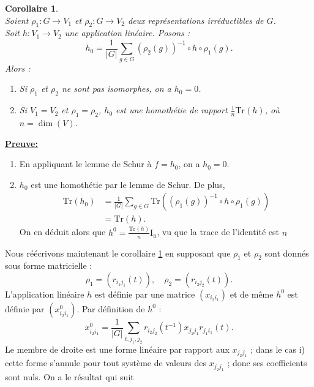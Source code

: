 \documentclass[a4paper, 14pt]{report}
\newtheorem{corollary}{Corollaire}[section]
\begin{document}
\begin{onehalfspace}
{\begin{enumerate} [label=\roman*)]
\end{enumerate}
	

\begin{corollary} \cite{serre1971representation} \label{cor1}\\
Soient \( \rho_1 : G \rightarrow V_1 \) et \( \rho_2 : G \rightarrow V_2 \) deux représentations irréductibles de \( G \). \\
Soit \( h  : V_1 \to V_2 \) une application linéaire. Posons :
	\[
	h_0 = \frac{1}{|G|} \sum_{g \in G} (\rho_2(g))^{-1} \circ h \circ \rho_1(g).
	\]
Alors :
	\begin{enumerate}[label=\roman*)]
		\item Si \( \rho_1 \) et \( \rho_2 \) ne sont pas isomorphes, on a \( h_0 = 0 \).
		\item Si \( V_1 = V_2 \) et \( \rho_1 = \rho_2 \), \( h_0 \) est une homothétie de rapport \( \frac{1}{n} \text{Tr}(h)  \), où \( n = \dim(V) \).
	\end{enumerate}
\end{corollary}

	
\textbf{\underline{Preuve:}}
\begin{enumerate}[label=\roman*)]
	\item En appliquant le lemme de Schur à \( f = h_0 \), on a \( h_0 = 0 \).
	\item \( h_0 \) est une homothétie par le lemme de Schur. De plus, \[
	\begin{aligned}
		\text{Tr}(h_0) &= \frac{1}{|G|} \sum_{g \in G} \text{Tr}((\rho_1(g))^{-1} \circ h \circ \rho_1(g)) \\
		&= \text{Tr}(h).
	\end{aligned}
	\]
On en déduit alors que \( h^0 = \frac{\text{Tr}(h)}{n} \mathrm{I_n} \), vu que la trace de l’identité est \( n \)
\end{enumerate}

Nous réécrivons maintenant le corollaire \ref{cor1} en supposant que $\rho_1$ et $\rho_2$ sont donnés sous forme matricielle :
\[
\rho_{1} = (r_{i_1 j_1}(t)), \quad \rho_{2} = (r_{i_2 j_2}(t)).
\]
L'application linéaire $h$ est définie par une matrice $(x_{i_2 i_1})$ et de même $h^0$ est définie par $(x^0_{i_2 i_1})$. Par définition de $h^0$ :
\[
x^0_{i_2 i_1} = \frac{1}{|G|} \sum_{t, j_1, j_2} r_{i_2 j_2}(t^{-1}) x_{j_2 j_1} r_{j_1 i_1}(t).
\]
Le membre de droite est une forme linéaire par rapport aux $x_{j_2 j_1}$ ; dans le cas i) cette forme s'annule pour tout système de valeurs des $x_{j_2 j_1}$ ; donc ses coefficients sont nuls. On a le
résultat qui suit

}
\end{onehalfspace}
\end{document}
